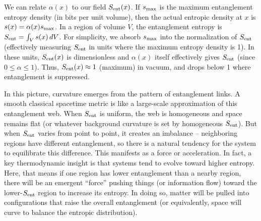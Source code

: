 \documentclass[11pt]{article}
\begin{document}
We can relate $\alpha(x)$ to our field $S_{\rm ent}(x)$. If $s_{\rm max}$ is the maximum entanglement entropy density (in bits per unit volume), then the actual entropic density at $x$ is $s(x) = \alpha(x) s_{\rm max}$. In a region of volume $V$, the entanglement entropy is $S_{\rm ent} = \int_V s(x)\,dV$. For simplicity, we absorb $s_{\rm max}$ into the normalization of $S_{\rm ent}$ (effectively measuring $S_{\rm ent}$ in units where the maximum entropy density is 1). In these units, $S_{\rm ent}(x)$ is dimensionless and $\alpha(x)$ itself effectively gives $S_{\rm ent}$ (since $0 \le \alpha \le 1$)​. Thus, $S_{\rm ent}(x) \approx 1$ (maximum) in vacuum, and drops below 1 where entanglement is suppressed.

In this picture, curvature emerges from the pattern of entanglement links. A smooth classical spacetime metric is like a large-scale approximation of this entanglement web. When $S_{\rm ent}$ is uniform, the web is homogeneous and space remains flat (or whatever background curvature is set by homogeneous $S_{\rm ent}$). But when $S_{\rm ent}$ varies from point to point, it creates an imbalance – neighboring regions have different entanglement, so there is a natural tendency for the system to equilibrate this difference. This manifests as a force or acceleration. In fact, a key thermodynamic insight is that systems tend to evolve toward higher entropy. Here, that means if one region has lower entanglement than a nearby region, there will be an emergent “force” pushing things (or information flow) toward the lower-$S_{\rm ent}$ region to increase its entropy. In doing so, matter will be pulled into configurations that raise the overall entanglement (or equivalently, space will curve to balance the entropic distribution).
\end{document}
